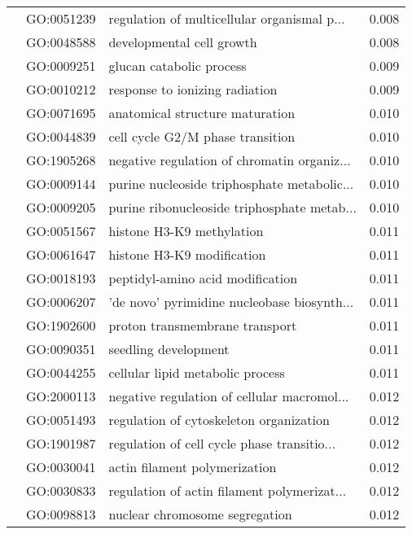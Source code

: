 \begin{longtable}{lllr}
   & GO:0051239 &  regulation of multicellular organismal p... &         0.008 \\
   & GO:0048588 &                    developmental cell growth &         0.008 \\
   & GO:0009251 &                     glucan catabolic process &         0.009 \\
   & GO:0010212 &               response to ionizing radiation &         0.009 \\
   & GO:0071695 &              anatomical structure maturation &         0.010 \\
   & GO:0044839 &             cell cycle G2/M phase transition &         0.010 \\
   & GO:1905268 &  negative regulation of chromatin organiz... &         0.010 \\
   & GO:0009144 &  purine nucleoside triphosphate metabolic... &         0.010 \\
   & GO:0009205 &  purine ribonucleoside triphosphate metab... &         0.010 \\
   & GO:0051567 &                    histone H3-K9 methylation &         0.011 \\
   & GO:0061647 &                   histone H3-K9 modification &         0.011 \\
   & GO:0018193 &             peptidyl-amino acid modification &         0.011 \\
   & GO:0006207 &  'de novo' pyrimidine nucleobase biosynth... &         0.011 \\
   & GO:1902600 &               proton transmembrane transport &         0.011 \\
   & GO:0090351 &                         seedling development &         0.011 \\
   & GO:0044255 &             cellular lipid metabolic process &         0.011 \\
   & GO:2000113 &  negative regulation of cellular macromol... &         0.012 \\
   & GO:0051493 &      regulation of cytoskeleton organization &         0.012 \\
   & GO:1901987 &  regulation of cell cycle phase transitio... &         0.012 \\
   & GO:0030041 &                actin filament polymerization &         0.012 \\
   & GO:0030833 &  regulation of actin filament polymerizat... &         0.012 \\
   & GO:0098813 &               nuclear chromosome segregation &         0.012 \\

\end{longtable}
